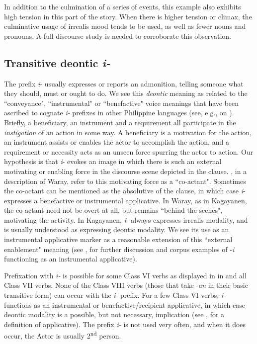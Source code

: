 In addition to the culmination of a series of events, this example also exhibits high tension in this part of the story. When there is higher tension or climax, the culminative usage of irrealis mood tends to be used, as well as fewer nouns and pronouns. A full discourse study is needed to corroborate this observation.

\subsection{Transitive deontic \textit{i-}}
\label{sec:transitivedeontic}

The prefix \textit{i}{}- usually expresses or reports an admonition, telling someone what they should, must or ought to do. We see this \textit{deontic} meaning as related to the ``conveyance", ``instrumental" or ``benefactive" voice meanings that have been ascribed to cognate \textit{i-} prefixes in other Philippine languages (see, e.g., \citealt[79]{wolff1973} on ). Briefly, a beneficiary, an instrument and a requirement all participate in the \textit{instigation} of an action in some way. A beneficiary is a motivation for the action, an instrument assists or enables the actor to accomplish the action, and a requirement or necessity acts as an unseen force spurring the actor to action. Our hypothesis is that \textit{i}- evokes an image in which there is such an external motivating or enabling force in the discourse scene depicted in the clause. \citep[344]{payneoyzon2022}, in a description of Waray, refer to this motivating force as a ``co-actant". Sometimes the co-actant can be mentioned as the absolutive of the clause, in which case \textit{i}- expresses a benefactive or instrumental applicative. In Waray, as in Kagayanen, the co-actant need not be overt at all, but remains ``behind the scenes", motivating the activity. In Kagayanen, \textit{i}- always expresses irrealis modality, and is usually understood as expressing deontic modality. We see its use as an instrumental applicative marker as a reasonable extension of this ``external enablement" meaning (see ,  for further discussion and corpus examples of -\textit{i} functioning as an instrumental applicative). 

Prefixation with \textit{i-} is possible for some Class VI verbs as displayed in  in  and all Class VII verbs. None of the Class VIII verbs (those that take -\textit{an} in their basic transitive form) can occur with the \textit{i}{}- prefix. For a few Class VI verbs, \textit{i}{}- functions as an instrumental or benefactive/recipient applicative, in which case deontic modality is a possible, but not necessary, implication (see ,  for a definition of applicative). The prefix \textit{i-} is not used very often, and when it does occur, the Actor is usually 2\textsuperscript{nd} person.


